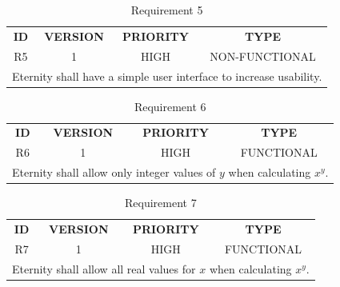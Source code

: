 \documentclass[11pt,a4paper]{report}
\theoremstyle{definition}
\theoremstyle{remark}
\begin{document}
        \begin{table}[ht]
        \centering
            \begin{tabular}{cccc} %
                \textbf{ID} & \textbf{VERSION} & \textbf{PRIORITY} & \textbf{TYPE}\\
                        R5  &           1      &           HIGH    &      NON-FUNCTIONAL\\
                \hline
                \multicolumn{4}{l}{Eternity shall have a simple user interface to increase usability.}
            \end{tabular}
            \caption{Requirement 5}
            \label{tab:table-requirements-5}
        \end{table}
        \vspace{3em}
        
        \begin{table}[ht]
        \centering
            \begin{tabular}{cccc} %
                \textbf{ID} & \textbf{VERSION} & \textbf{PRIORITY} & \textbf{TYPE}\\
                        R6  &           1      &           HIGH    &      FUNCTIONAL\\
                \hline
                \multicolumn{4}{l}{Eternity shall allow only integer values of $y$ when calculating $x^y$.}
            \end{tabular}
            \caption{Requirement 6}
            \label{tab:table-requirements-6}
        \end{table}
        \vspace{3em}
        
        \begin{table}[ht]
        \centering
            \begin{tabular}{cccc} %
                \textbf{ID} & \textbf{VERSION} & \textbf{PRIORITY} & \textbf{TYPE}\\
                        R7  &           1      &           HIGH    &      FUNCTIONAL\\
                \hline
                \multicolumn{4}{l}{Eternity shall allow all real values for $x$ when calculating $x^y$.}
            \end{tabular}
            \caption{Requirement 7}
            \label{tab:table-requirements-7}
        \end{table}
        \vspace{3em}
        
\end{document}
